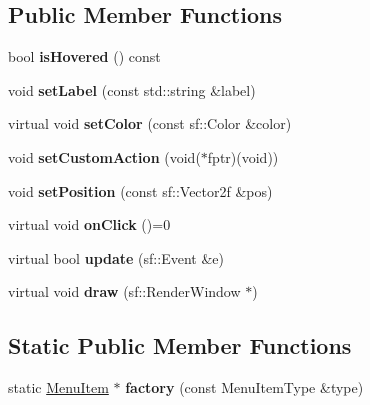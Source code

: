 \subsection*{Public Member Functions}
\begin{DoxyCompactItemize}
\item 
bool {\bfseries is\+Hovered} () const \hypertarget{classMenuItem_a4c2eaee3d8b9cfca3f3fad643ae52db9}{}\label{classMenuItem_a4c2eaee3d8b9cfca3f3fad643ae52db9}

\item 
void {\bfseries set\+Label} (const std\+::string \&label)\hypertarget{classMenuItem_ae9c91802e884fb71f44c43044defb132}{}\label{classMenuItem_ae9c91802e884fb71f44c43044defb132}

\item 
virtual void {\bfseries set\+Color} (const sf\+::\+Color \&color)\hypertarget{classMenuItem_af7cf04bb5938e33e585a512a383d90ad}{}\label{classMenuItem_af7cf04bb5938e33e585a512a383d90ad}

\item 
void {\bfseries set\+Custom\+Action} (void($\ast$fptr)(void))\hypertarget{classMenuItem_a7584bdd26de915b0b9effacd0a166828}{}\label{classMenuItem_a7584bdd26de915b0b9effacd0a166828}

\item 
void {\bfseries set\+Position} (const sf\+::\+Vector2f \&pos)\hypertarget{classMenuItem_a476d10fb3b06e1e0fce9c7d9d7bd29f7}{}\label{classMenuItem_a476d10fb3b06e1e0fce9c7d9d7bd29f7}

\item 
virtual void {\bfseries on\+Click} ()=0\hypertarget{classMenuItem_a46e0f2787b4d975a36a1b6165aece45e}{}\label{classMenuItem_a46e0f2787b4d975a36a1b6165aece45e}

\item 
virtual bool {\bfseries update} (sf\+::\+Event \&e)\hypertarget{classMenuItem_aee796e7143ae248b78cd9f45eb1ff3a8}{}\label{classMenuItem_aee796e7143ae248b78cd9f45eb1ff3a8}

\item 
virtual void {\bfseries draw} (sf\+::\+Render\+Window $\ast$)\hypertarget{classMenuItem_a63bbb4f527225e407ff32969819bee7b}{}\label{classMenuItem_a63bbb4f527225e407ff32969819bee7b}

\end{DoxyCompactItemize}
\subsection*{Static Public Member Functions}
\begin{DoxyCompactItemize}
\item 
static \hyperlink{classMenuItem}{Menu\+Item} $\ast$ {\bfseries factory} (const Menu\+Item\+Type \&type)\hypertarget{classMenuItem_ae0e6736cb819e5f95ae479117d6d10aa}{}\label{classMenuItem_ae0e6736cb819e5f95ae479117d6d10aa}

\end{DoxyCompactItemize}
